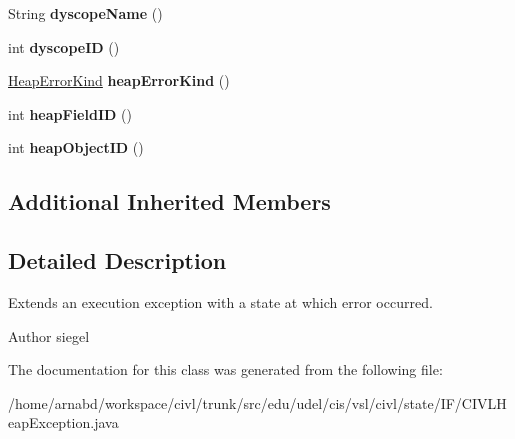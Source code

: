 \begin{DoxyCompactItemize}
\item 
\hypertarget{classedu_1_1udel_1_1cis_1_1vsl_1_1civl_1_1state_1_1IF_1_1CIVLHeapException_a14cac1fb74e570b473c26dcd67c24710}{}String {\bfseries dyscope\+Name} ()\label{classedu_1_1udel_1_1cis_1_1vsl_1_1civl_1_1state_1_1IF_1_1CIVLHeapException_a14cac1fb74e570b473c26dcd67c24710}

\item 
\hypertarget{classedu_1_1udel_1_1cis_1_1vsl_1_1civl_1_1state_1_1IF_1_1CIVLHeapException_a7835bce4faaf64b0cf076c64a3e51c3c}{}int {\bfseries dyscope\+I\+D} ()\label{classedu_1_1udel_1_1cis_1_1vsl_1_1civl_1_1state_1_1IF_1_1CIVLHeapException_a7835bce4faaf64b0cf076c64a3e51c3c}

\item 
\hypertarget{classedu_1_1udel_1_1cis_1_1vsl_1_1civl_1_1state_1_1IF_1_1CIVLHeapException_a64d2f30bdb49f77dff794b6d49529627}{}\hyperlink{enumedu_1_1udel_1_1cis_1_1vsl_1_1civl_1_1state_1_1IF_1_1CIVLHeapException_1_1HeapErrorKind}{Heap\+Error\+Kind} {\bfseries heap\+Error\+Kind} ()\label{classedu_1_1udel_1_1cis_1_1vsl_1_1civl_1_1state_1_1IF_1_1CIVLHeapException_a64d2f30bdb49f77dff794b6d49529627}

\item 
\hypertarget{classedu_1_1udel_1_1cis_1_1vsl_1_1civl_1_1state_1_1IF_1_1CIVLHeapException_aec1c28cf69cb760b576aa278ba92d533}{}int {\bfseries heap\+Field\+I\+D} ()\label{classedu_1_1udel_1_1cis_1_1vsl_1_1civl_1_1state_1_1IF_1_1CIVLHeapException_aec1c28cf69cb760b576aa278ba92d533}

\item 
\hypertarget{classedu_1_1udel_1_1cis_1_1vsl_1_1civl_1_1state_1_1IF_1_1CIVLHeapException_adea040cec884a3c3286e3b73d750b3ba}{}int {\bfseries heap\+Object\+I\+D} ()\label{classedu_1_1udel_1_1cis_1_1vsl_1_1civl_1_1state_1_1IF_1_1CIVLHeapException_adea040cec884a3c3286e3b73d750b3ba}

\end{DoxyCompactItemize}
\subsection*{Additional Inherited Members}


\subsection{Detailed Description}
Extends an execution exception with a state at which error occurred. 

\begin{DoxyAuthor}{Author}
siegel 
\end{DoxyAuthor}


The documentation for this class was generated from the following file\+:\begin{DoxyCompactItemize}
\item 
/home/arnabd/workspace/civl/trunk/src/edu/udel/cis/vsl/civl/state/\+I\+F/C\+I\+V\+L\+Heap\+Exception.\+java\end{DoxyCompactItemize}

